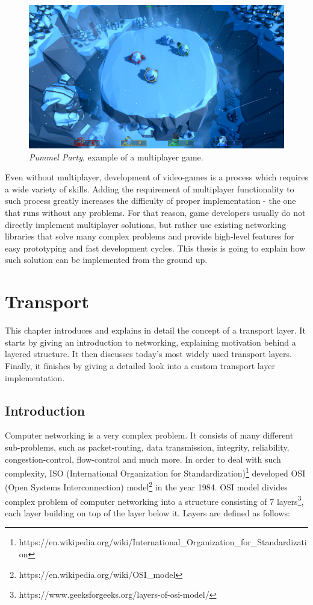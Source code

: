 \documentclass[times, utf8, diplomski]{fer}
\begin{document}
\begin{figure}[H]
	\centering
	\includegraphics[scale=0.33]{Pummel-Party}
	\caption{\textit{Pummel Party}, example of a multiplayer game.}
\end{figure}
 
Even without multiplayer, development of video-games is a process which requires a wide variety of skills. Adding the requirement of multiplayer functionality to such process greatly increases the difficulty of proper implementation - the one that runs without any problems. For that reason, game developers usually do not directly implement multiplayer solutions, but rather use existing networking libraries that solve many complex problems and provide high-level features for easy prototyping and fast development cycles. This thesis is going to explain how such solution can be implemented from the ground up. \\

\chapter{Transport}
This chapter introduces and explains in detail the concept of a transport layer. It starts by giving an introduction to networking, explaining motivation behind a layered structure. It then discusses today's most widely used transport layers. Finally, it finishes by giving a detailed look into a custom transport layer implementation.

\section{Introduction}
Computer networking is a very complex problem. It consists of many different sub-problems, such as packet-routing, data transmission, integrity, reliability, congestion-control, flow-control and much more. In order to deal with such complexity, ISO (International Organization for Standardization)\footnote{https://en.wikipedia.org/wiki/International\_Organization\_for\_Standardization} developed OSI (Open Systems Interconnection) model\footnote{https://en.wikipedia.org/wiki/OSI\_model} in the year 1984. OSI model divides complex problem of computer networking into a structure consisting of 7 layers\footnote{https://www.geeksforgeeks.org/layers-of-osi-model/}, each layer building on top of the layer below it. Layers are defined as follows:
\end{document}
